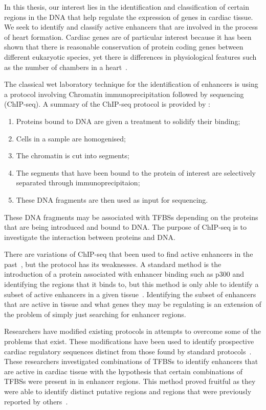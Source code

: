 

In this thesis, our interest lies in the identification and classification of certain regions in the DNA that help regulate the expression of genes in cardiac tissue. We seek to identify and classify active enhancers that are involved in the process of heart formation. Cardiac genes are of particular interest because it has been shown that there is reasonable conservation of protein coding genes between different eukaryotic species, yet there is differences in physiological features such as the number of chambers in a heart~\cite{harvey1996nk}. %

The classical wet laboratory technique for the identification of enhancers is using a protocol involving Chromatin immunoprecipitation followed by sequencing (ChIP-seq). A summary of the ChIP-seq protocol is provided by \cite{collas2010current}:
    \begin{enumerate}
        \item Proteins bound to DNA are given a treatment to solidify their binding;
        \item Cells in a sample are homogenised;
        \item The chromatin is cut into segments;
        \item The segments that have been bound to the protein of interest are selectively separated through immunoprecipitaion;
        \item These DNA fragments are then used as input for sequencing.
    \end{enumerate}
These DNA fragments may be associated with TFBSs depending on the proteins that are being introduced and bound to DNA. The purpose of ChIP-seq is to investigate the interaction between proteins and DNA.

There are variations of ChIP-seq that been used to find active enhancers in the past~\cite{visel2009chip}, but the protocol has its weaknesses. A standard method is the introduction of a protein associated with enhancer binding such as p300 and identifying the regions that it binds to, but this method is only able to identify a subset of active enhancers in a given tissue~\cite{heintzman2007distinct}. Identifying the subset of enhancers that are active in tissue and what genes they may be regulating is an extension of the problem of simply just searching for enhancer regions.

Researchers have modified existing protocols in attempts to overcome some of the problems that exist. These modifications have been used to identify prospective cardiac regulatory sequences distinct from those found by standard protocols~\cite{he2011co}. These researchers investigated combinations of TFBSs to identify enhancers that are active in cardiac tissue with the hypothesis that certain combinations of TFBSs were present in in enhancer regions. This method proved fruitful as they were able to identify distinct putative regions and regions that were previously reported by others~\cite{blow2010chip}.%

